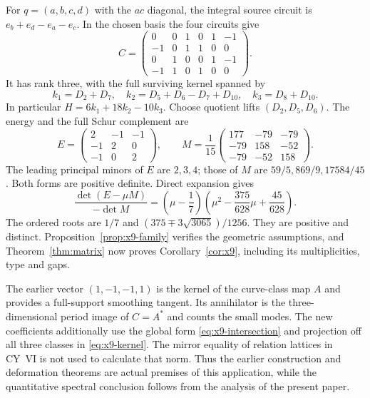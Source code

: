 For $q=(a,b,c,d)$ with the $ac$ diagonal, the integral source circuit
is $e_b+e_d-e_a-e_c$. In the chosen basis the four circuits give
\begin{equation}\label{eq:x9-period-matrix}
 C=\begin{pmatrix}
 0&0&1&0&1&-1\\
 -1&0&1&1&0&0\\
 0&1&0&0&1&-1\\
 -1&1&0&1&0&0
 \end{pmatrix}.
\end{equation}
It has rank three, with the full surviving kernel spanned by
\begin{equation}\label{eq:x9-kernel}
 k_1=D_2+D_7,\quad k_2=D_5+D_6-D_7+D_{10},\quad
 k_3=D_8+D_{10}.
\end{equation}
In particular $H=6k_1+18k_2-10k_3$. Choose quotient lifts
$(D_2,D_5,D_6)$. The energy and the full Schur complement are
\begin{equation}\label{eq:x9-forms}
 E=\begin{pmatrix}2&-1&-1\\-1&2&0\\-1&0&2\end{pmatrix},
 \qquad
 M=\frac1{15}\begin{pmatrix}
 177&-79&-79\\-79&158&-52\\-79&-52&158
 \end{pmatrix}.
\end{equation}
The leading principal minors of $E$ are $2,3,4$; those of $M$ are
$59/5,869/9,17584/45$. Both forms are positive definite. Direct
expansion gives
\begin{equation}\label{eq:x9-polynomial}
 \frac{\det(E-\mu M)}{-\det M}
 =\left(\mu-\frac17\right)
   \left(\mu^2-\frac{375}{628}\mu+\frac{45}{628}\right).
\end{equation}
The ordered roots are $1/7$ and
$(375\mp3\sqrt{3065})/1256$. They are positive and distinct.
Proposition~\ref{prop:x9-family} verifies the geometric assumptions,
and Theorem~\ref{thm:matrix} now proves
Corollary~\ref{cor:x9}, including its multiplicities, type and gaps.

The earlier vector $(1,-1,-1,1)$ is the kernel of the curve-class
map $A$ and provides a full-support smoothing tangent. Its annihilator
is the three-dimensional period image of $C=A^*$ and counts the
small modes. The new coefficients additionally use the global form
\eqref{eq:x9-intersection} and projection off all three classes in
\eqref{eq:x9-kernel}. The mirror equality of relation lattices in
CY~VI is not used to calculate that norm. Thus the earlier construction
and deformation theorems are actual premises of this application,
while the quantitative spectral conclusion follows from the analysis
of the present paper.
